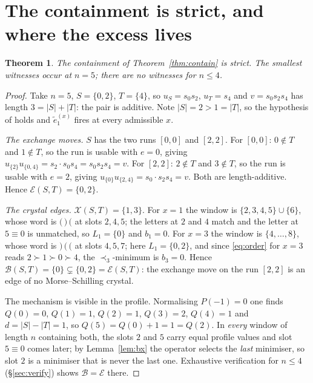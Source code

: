 \documentclass[11pt]{article}
\newtheorem{thm}{Theorem}[section]
\theoremstyle{definition}
\newcommand{\et}{\tilde e_1}
\newcommand{\XX}{\mathcal{X}}
\newcommand{\EE}{\mathcal{E}}
\newcommand{\BB}{\mathcal{B}}
\begin{document}
\section{The containment is strict, and where the excess lives}

\begin{thm}\label{thm:strict}
The containment of Theorem~\ref{thm:contain} is strict. The smallest witnesses occur at $n=5$;
there are no witnesses for $n\le4$.
\end{thm}

\begin{proof}
Take $n=5$, $S=\{0,2\}$, $T=\{4\}$, so $u_S=s_0s_2$, $u_T=s_4$ and $v=s_0s_2s_4$ has length
$3=|S|+|T|$: the pair is additive. Note $|S|=2>1=|T|$, so the hypothesis of
\cite[Thm.~4.1]{Clio2} holds and $\et^{(x)}$ fires at every admissible $x$.

\emph{The exchange moves.} $S$ has the two runs $[0,0]$ and $[2,2]$. For $[0,0]$: $0\notin T$
and $1\notin T$, so the run is usable with $e=0$, giving $u_{\{2\}}u_{\{0,4\}}=s_2\cdot s_0s_4
=s_0s_2s_4=v$. For $[2,2]$: $2\notin T$ and $3\notin T$, so the run is usable with $e=2$,
giving $u_{\{0\}}u_{\{2,4\}}=s_0\cdot s_2s_4=v$. Both are length-additive. Hence
$\EE(S,T)=\{0,2\}$.

\emph{The crystal edges.} $\XX(S,T)=\{1,3\}$. For $x=1$ the window is $\{2,3,4,5\}\cup\{6\}$,
whose word is $\texttt{(}\,\texttt{)}\,\texttt{(}$ at slots $2,4,5$; the letters at $2$ and $4$
match and the letter at $5\equiv0$ is unmatched, so $L_1=\{0\}$ and $b_1=0$. For $x=3$ the
window is $\{4,\dots,8\}$, whose word is $\texttt{)}\,\texttt{(}\,\texttt{(}$ at slots
$4,5,7$; here $L_1=\{0,2\}$, and since \eqref{eq:order} for $x=3$ reads
$2\succ1\succ0\succ4$, the $\prec_3$-minimum is $b_3=0$. Hence $\BB(S,T)=\{0\}\subsetneq
\{0,2\}=\EE(S,T)$: the exchange move on the run $[2,2]$ is an edge of no Morse--Schilling
crystal.

The mechanism is visible in the profile. Normalising $P(-1)=0$ one finds $Q(0)=0$, $Q(1)=1$,
$Q(2)=1$, $Q(3)=2$, $Q(4)=1$ and $d=|S|-|T|=1$, so $Q(5)=Q(0)+1=1=Q(2)$. In \emph{every}
window of length $n$ containing both, the slots $2$ and $5$ carry equal profile values and
slot $5\equiv0$ comes later; by Lemma~\ref{lem:bx} the operator selects the \emph{last}
minimiser, so slot $2$ is a minimiser that is never the last one. Exhaustive verification for
$n\le4$ (\S\ref{sec:verify}) shows $\BB=\EE$ there.
\end{proof}
\end{document}
